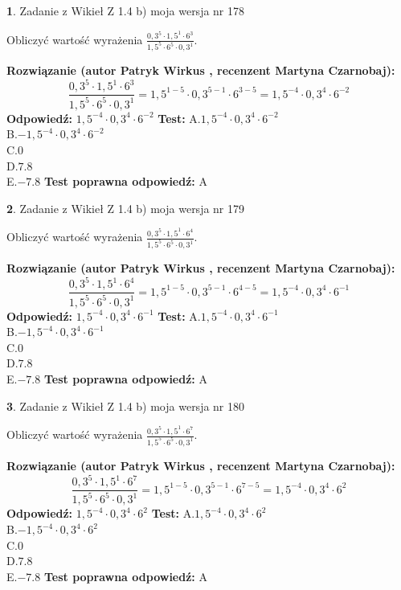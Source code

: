 \documentclass[12pt, a4paper]{article}
\theoremstyle{definition} %
\newtheorem{zad}{}
\newcommand{\zadStart}[1]{\begin{zad}#1\newline}
\newcommand{\zadStop}{\end{zad}}
\newcommand{\rozwStart}[2]{\noindent \textbf{Rozwiązanie (autor #1 , recenzent #2): }\newline}
\newcommand{\rozwStop}{\newline}
\newcommand{\odpStart}{\noindent \textbf{Odpowiedź:}\newline}
\newcommand{\odpStop}{\newline}
\newcommand{\testStart}{\noindent \textbf{Test:}\newline}
\newcommand{\testStop}{\newline}
\newcommand{\kluczStart}{\noindent \textbf{Test poprawna odpowiedź:}\newline}
\newcommand{\kluczStop}{\newline}
\begin{document}
\zadStart{Zadanie z Wikieł Z 1.4 b) moja wersja nr 178}

Obliczyć wartość wyrażenia $\frac{0,3^{5}\cdot1,5^{1}\cdot6^{3}}{1,5^{5}\cdot6^{5}\cdot0,3^{1}}$.
\zadStop
\rozwStart{Patryk Wirkus}{Martyna Czarnobaj}
$$\frac{0,3^{5}\cdot1,5^{1}\cdot6^{3}}{1,5^{5}\cdot6^{5}\cdot0,3^{1}} = 1,5^{1-5} \cdot 0,3^{5-1} \cdot 6^{3-5} = 1,5^{-4} \cdot 0,3^{4} \cdot 6^{-2}$$
\rozwStop
\odpStart
$1,5^{-4} \cdot 0,3^{4} \cdot 6^{-2}$
\odpStop
\testStart
A.$1,5^{-4} \cdot 0,3^{4} \cdot 6^{-2}$\\ B.$-1,5^{-4} \cdot 0,3^{4} \cdot 6^{-2}$\\ C.$0$\\ D.$7.8$\\ E.$-7.8$
\testStop
\kluczStart
A
\kluczStop



\zadStart{Zadanie z Wikieł Z 1.4 b) moja wersja nr 179}

Obliczyć wartość wyrażenia $\frac{0,3^{5}\cdot1,5^{1}\cdot6^{4}}{1,5^{5}\cdot6^{5}\cdot0,3^{1}}$.
\zadStop
\rozwStart{Patryk Wirkus}{Martyna Czarnobaj}
$$\frac{0,3^{5}\cdot1,5^{1}\cdot6^{4}}{1,5^{5}\cdot6^{5}\cdot0,3^{1}} = 1,5^{1-5} \cdot 0,3^{5-1} \cdot 6^{4-5} = 1,5^{-4} \cdot 0,3^{4} \cdot 6^{-1}$$
\rozwStop
\odpStart
$1,5^{-4} \cdot 0,3^{4} \cdot 6^{-1}$
\odpStop
\testStart
A.$1,5^{-4} \cdot 0,3^{4} \cdot 6^{-1}$\\ B.$-1,5^{-4} \cdot 0,3^{4} \cdot 6^{-1}$\\ C.$0$\\ D.$7.8$\\ E.$-7.8$
\testStop
\kluczStart
A
\kluczStop



\zadStart{Zadanie z Wikieł Z 1.4 b) moja wersja nr 180}

Obliczyć wartość wyrażenia $\frac{0,3^{5}\cdot1,5^{1}\cdot6^{7}}{1,5^{5}\cdot6^{5}\cdot0,3^{1}}$.
\zadStop
\rozwStart{Patryk Wirkus}{Martyna Czarnobaj}
$$\frac{0,3^{5}\cdot1,5^{1}\cdot6^{7}}{1,5^{5}\cdot6^{5}\cdot0,3^{1}} = 1,5^{1-5} \cdot 0,3^{5-1} \cdot 6^{7-5} = 1,5^{-4} \cdot 0,3^{4} \cdot 6^{2}$$
\rozwStop
\odpStart
$1,5^{-4} \cdot 0,3^{4} \cdot 6^{2}$
\odpStop
\testStart
A.$1,5^{-4} \cdot 0,3^{4} \cdot 6^{2}$\\ B.$-1,5^{-4} \cdot 0,3^{4} \cdot 6^{2}$\\ C.$0$\\ D.$7.8$\\ E.$-7.8$
\testStop
\kluczStart
A
\kluczStop
\end{document}
